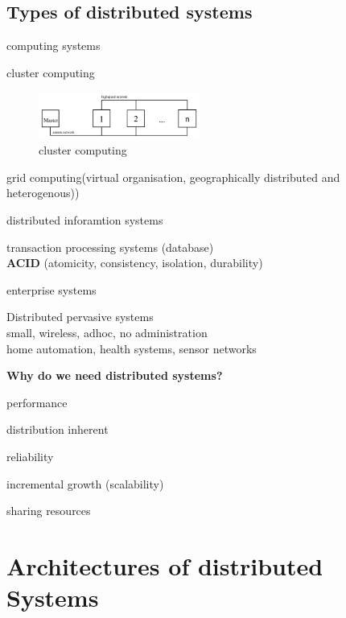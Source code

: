 \documentclass[ngerman,a4paper]{report}
\begin{document}
\section{Types of distributed systems}
\begin{compactitem}
\item computing systems
\begin{compactitem}
\item cluster computing
\begin{figure}[h]
	\centering
	\includegraphics[width=200px]{gfx/cluster_computing.png}
	\caption{cluster computing}
	\label{img:cluster_comp}
\end{figure}
\item grid computing(virtual organisation, geographically distributed and heterogenous))
\end{compactitem}
\item distributed inforamtion systems
\begin{compactitem}
\item transaction processing systems (database) \\
\textbf{ACID} (atomicity, consistency, isolation, durability)
\item enterprise systems
\end{compactitem}
\item Distributed pervasive systems\\
small, wireless, adhoc, no administration\\
home automation, health systems, sensor networks
\end{compactitem}

\textbf{Why do we need distributed systems?}\\
\begin{compactitem}
\item performance
\item distribution inherent
\item reliability
\item incremental growth (scalability)
\item sharing resources
\end{compactitem}

\chapter{Architectures of distributed Systems}
\end{document}
